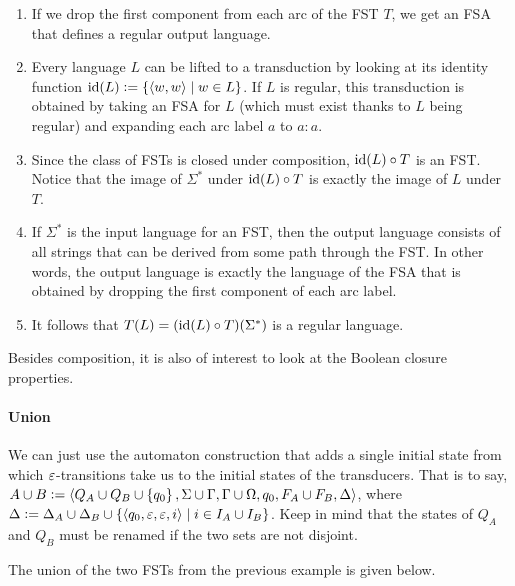 \begin{enumerate}
    \item If we drop the first component from each arc of the FST $T$, we get an FSA that defines a regular output language.
    \item Every language $L$ can be lifted to a transduction by looking at its identity function $\mathrm{id}(L) \mathrel{\mathop:}= \left \{ \left \langle w,w \right \rangle  \mid w \in L \right \}$.
        If $L$ is regular, this transduction is obtained by taking an FSA for $L$ (which must exist thanks to $L$ being regular) and expanding each arc label $a$ to $a:a$.
    \item Since the class of FSTs is closed under composition, $\mathrm{id}(L) \circ T$ is an FST\@.
        Notice that the image of $\Sigma^*$ under $\mathrm{id}(L) \circ T$ is exactly the image of $L$ under $T$.
    \item If $\Sigma^*$ is the input language for an FST, then the output language consists of all strings that can be derived from some path through the FST\@.
        In other words, the output language is exactly the language of the FSA that is obtained by dropping the first component of each arc label.
    \item It follows that $T(L) = (\mathrm{id}(L) \circ T)(\Sigma^*)$ is a regular language.
\end{enumerate}
%

Besides composition, it is also of interest to look at the Boolean closure properties.
%
\paragraph{Union}
We can just use the automaton construction that adds a single initial state from which $\varepsilon$-transitions take us to the initial states of the transducers.
That is to say, $A \cup B \mathrel{\mathop:}= \left \langle Q_A \cup Q_B \cup \left \{ q_0 \right \}, \Sigma \cup \Gamma, \Gamma \cup \Omega, q_0, F_A \cup F_B, \Delta \right \rangle $, where
\(
    \Delta \mathrel{\mathop:}= \Delta_A \cup \Delta_B \cup
        \left \{ 
            \left \langle q_0, \varepsilon, \varepsilon, i \right \rangle  \mid i \in I_A \cup I_B
         \right \}
\).
Keep in mind that the states of $Q_A$ and $Q_B$ must be renamed if the two sets are not disjoint.
%
\begin{examplebox}
    The union of the two FSTs from the previous example is given below.
    \begin{center}
        
    \end{center}
\end{examplebox}

